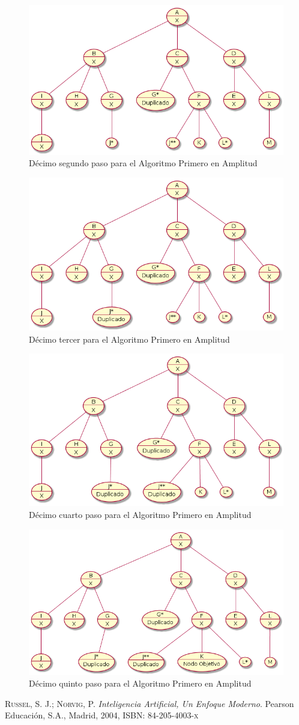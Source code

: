 \documentclass{article}
\begin{document}
\begin{figure}[H]
  \centering
  \includegraphics[width=.4\linewidth]{EJ4/ej4_011.png}
  \caption{D\'ecimo segundo paso para el Algoritmo Primero en Amplitud}
  \label{gr:g25}
\end{figure}

\begin{figure}[H]
  \centering
  \includegraphics[width=.4\linewidth]{EJ4/ej4_012.png}
  \caption{D\'ecimo tercer para el Algoritmo Primero en Amplitud}
  \label{gr:g26}
\end{figure}

\begin{figure}[H]
  \centering
  \includegraphics[width=.4\linewidth]{EJ4/ej4_013.png}
  \caption{D\'ecimo cuarto paso para el Algoritmo Primero en Amplitud}
  \label{gr:g27}
\end{figure}

\begin{figure}[H]
  \centering
  \includegraphics[width=.4\linewidth]{EJ4/ej4_014.png}
  \caption{D\'ecimo quinto paso para el Algoritmo Primero en Amplitud}
  \label{gr:g28}
\end{figure}
\newpage
\begin{thebibliography}{99}
	\newblock \textsc{Russel, S. J.; Norvig, P.} \textit{Inteligencia Artificial, Un Enfoque Moderno}. Pearson Educaci\'on, S.A., Madrid, 2004, \textsc{ISBN: 84-205-4003-x}
\end{thebibliography}
\end{document}
